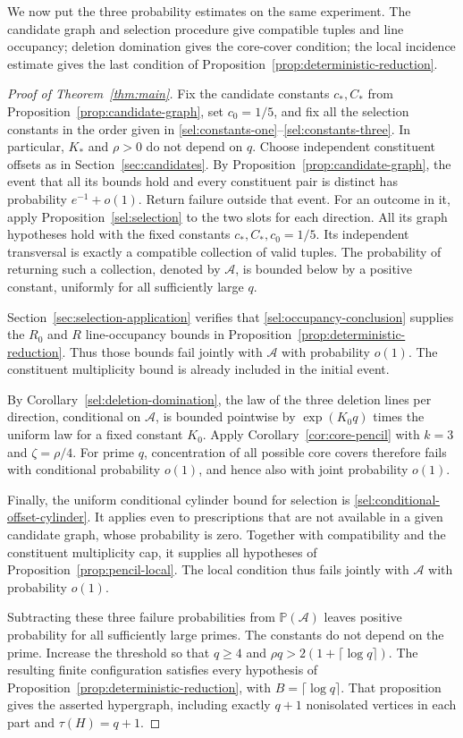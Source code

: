 \documentclass[11pt]{article}
\theoremstyle{definition}
\theoremstyle{remark}
\newcommand{\Prb}{\mathbb P}
\begin{document}
We now put the three probability estimates on the same experiment. The
candidate graph and selection procedure give compatible tuples and line
occupancy; deletion domination gives the core-cover condition; the local
incidence estimate gives the last condition of
Proposition~\ref{prop:deterministic-reduction}.

\begin{proof}[Proof of Theorem~\ref{thm:main}]
Fix the candidate constants $c_*,C_*$ from
Proposition~\ref{prop:candidate-graph}, set $c_0=1/5$, and fix all the
selection constants in the order given in
\eqref{sel:constants-one}--\eqref{sel:constants-three}. In particular,
$K_*$ and $\rho>0$ do not depend on $q$.
Choose independent constituent offsets as in
Section~\ref{sec:candidates}. By Proposition~\ref{prop:candidate-graph},
the event that all its bounds hold and every constituent pair is distinct
has probability $e^{-1}+o(1)$. Return failure outside that event.
For an outcome in it, apply Proposition~\ref{sel:selection} to the two
slots for each direction. All its graph hypotheses hold with the fixed
constants $c_*,C_*,c_0=1/5$. Its independent transversal is exactly a
compatible collection of valid tuples. The probability of returning
such a collection, denoted by $\mathcal A$, is bounded below by a
positive constant, uniformly for all sufficiently large $q$.

Section~\ref{sec:selection-application} verifies that
\eqref{sel:occupancy-conclusion} supplies the $R_0$ and $R$ line-occupancy
bounds in Proposition~\ref{prop:deterministic-reduction}. Thus those
bounds fail jointly with $\mathcal A$ with probability $o(1)$. The
constituent multiplicity bound is already included in the initial event.

By Corollary~\ref{sel:deletion-domination}, the law of the three deletion
lines per direction, conditional on $\mathcal A$, is bounded pointwise
by $\exp(K_0q)$ times the uniform law for a fixed constant $K_0$.
Apply Corollary~\ref{cor:core-pencil} with $k=3$ and
$\zeta=\rho/4$. For prime $q$, concentration of all possible core
covers therefore fails with conditional probability $o(1)$, and hence
also with joint probability $o(1)$.

Finally, the uniform conditional cylinder bound for selection is
\eqref{sel:conditional-offset-cylinder}. It applies even to prescriptions
that are not available in a given candidate graph, whose probability is
zero. Together with compatibility and the constituent multiplicity cap,
it supplies all hypotheses of Proposition~\ref{prop:pencil-local}.
The local condition thus fails jointly with $\mathcal A$ with probability
$o(1)$.

Subtracting these three failure probabilities from $\Prb(\mathcal A)$
leaves positive probability for all sufficiently large primes.
The constants do not depend on the prime. Increase the threshold so that
$q\ge4$ and $\rho q>2(1+\lceil\log q\rceil)$.
The resulting finite configuration satisfies every hypothesis of
Proposition~\ref{prop:deterministic-reduction}, with
$B=\lceil\log q\rceil$. That proposition gives the asserted hypergraph,
including exactly $q+1$ nonisolated vertices in each part and
$\tau(H)=q+1$.
\end{proof}

\appendix




\end{document}
